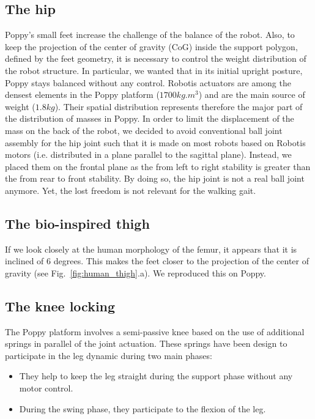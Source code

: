 \subsection{The hip} %
Poppy's small feet increase the challenge of the balance of the robot. Also, to keep the projection of the center of gravity (CoG) inside the support polygon, defined by the feet geometry, it is necessary to control the weight distribution of the robot structure. In particular, we wanted that in its initial upright posture, Poppy stays balanced without any control.  Robotis actuators are among the densest elements in the Poppy platform ($ 1700 kg.m^{3} $) and are the main source of weight ($1.8 kg$). Their spatial distribution represents therefore the major part of the distribution of masses in Poppy. In order to limit the displacement of the mass on the back of the robot, we decided to avoid conventional ball joint assembly for the hip joint such that it is made on most robots based on Robotis motors (i.e. distributed in a plane parallel to the sagittal plane). Instead, we placed them on the frontal plane as the from left to right stability is greater than the from rear to front stability. By doing so, the hip joint is not a real ball joint anymore. Yet, the lost freedom is not relevant for the walking gait.

\subsection{The bio-inspired thigh} %
If we look closely at the human morphology of the femur, it appears that it is inclined of 6 degrees. This makes the feet closer to the projection of the center of gravity (see Fig.~\ref{fig:human_thigh}.a). We reproduced this on Poppy.


\subsection{The knee locking} %
The Poppy platform involves a semi-passive knee based on the use of additional springs in parallel of the joint actuation. These springs have been design to participate in the leg dynamic during two main phases:
\begin{itemize}
    \item They help to keep the leg straight during the support phase without any motor control.
    \item During the swing phase, they participate to the flexion of the leg.
\end{itemize}

